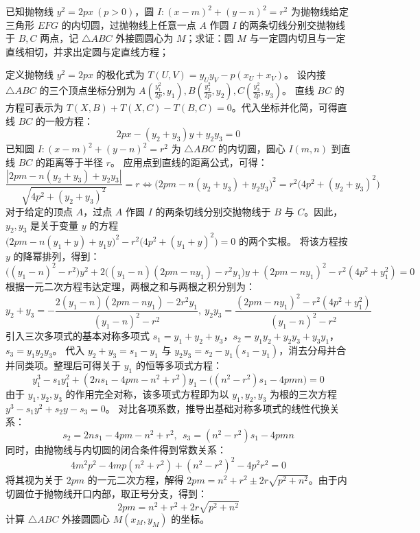 \begin{exercise}
已知抛物线 \(y^2 = 2px\ (p > 0)\)，圆 \(I: (x - m)^2 + (y - n)^2 = r^2\) 为抛物线给定三角形 \(EFG\) 的内切圆，过抛物线上任意一点 \(A\) 作圆 \(I\) 的两条切线分别交抛物线于 \(B,C\) 两点，记 \(\triangle ABC\) 外接圆圆心为 \(M\)；求证：圆 \(M\) 与一定圆内切且与一定直线相切，并求出定圆与定直线方程；
\end{exercise}
\begin{solution}
定义抛物线 $y^2 = 2px$ 的极化式为 $T(U, V) = y_U y_V - p(x_U + x_V)$。
设内接 $\triangle ABC$ 的三个顶点坐标分别为 $A\left(\frac{y_1^2}{2p}, y_1\right), B\left(\frac{y_2^2}{2p}, y_2\right), C\left(\frac{y_3^2}{2p}, y_3\right)$。
直线 $BC$ 的方程可表示为 $T(X, B) + T(X, C) - T(B, C) = 0$。代入坐标并化简，可得直线 $BC$ 的一般方程：
$$ 2px - (y_2+y_3)y + y_2 y_3 = 0 $$
已知圆 $I: (x-m)^2 + (y-n)^2 = r^2$ 为 $\triangle ABC$ 的内切圆，圆心 $I(m,n)$ 到直线 $BC$ 的距离等于半径 $r$。
应用点到直线的距离公式，可得：
$$ \frac{|2pm - n(y_2+y_3) + y_2 y_3|}{\sqrt{4p^2 + (y_2+y_3)^2}} = r\Leftrightarrow \big(2pm - n(y_2+y_3) + y_2 y_3\big)^2 = r^2\big(4p^2 + (y_2+y_3)^2\big)  $$
对于给定的顶点 $A$，过点 $A$ 作圆 $I$ 的两条切线分别交抛物线于 $B$ 与 $C$。因此，$y_2, y_3$ 是关于变量 $y$ 的方程 $\big(2pm - n(y_1+y) + y_1 y\big)^2 - r^2\big(4p^2 + (y_1+y)^2\big) = 0$ 的两个实根。
将该方程按 $y$ 的降幂排列，得到：
$$ \big((y_1 - n)^2 - r^2\big) y^2 + 2\big((y_1 - n)(2pm - n y_1) - r^2 y_1\big) y + (2pm - n y_1)^2 - r^2(4p^2 + y_1^2) = 0 $$
根据一元二次方程韦达定理，两根之和与两根之积分别为：
$$ y_2 + y_3 = -\frac{2(y_1 - n)(2pm - n y_1) - 2r^2 y_1}{(y_1 - n)^2 - r^2} ,~y_2 y_3 = \frac{(2pm - n y_1)^2 - r^2(4p^2 + y_1^2)}{(y_1 - n)^2 - r^2} $$
引入三次多项式的基本对称多项式 $s_1 = y_1+y_2+y_3$，$s_2 = y_1 y_2 + y_2 y_3 + y_3 y_1$，$s_3 = y_1 y_2 y_3$。
代入 $y_2+y_3 = s_1 - y_1$ 与 $y_2 y_3 = s_2 - y_1(s_1 - y_1)$，消去分母并合并同类项。整理后可得关于 $y_1$ 的恒等多项式方程：
$$ y_1^3 - s_1 y_1^2 + (2n s_1 - 4pm - n^2 + r^2) y_1 - \big((n^2 - r^2) s_1 - 4pmn\big) = 0 $$
由于 $y_1, y_2, y_3$ 的作用完全对称，该多项式方程即为以 $y_1, y_2, y_3$ 为根的三次方程 $y^3 - s_1 y^2 + s_2 y - s_3 = 0$。
对比各项系数，推导出基础对称多项式的线性代换关系：
$$ s_2 = 2n s_1 - 4pm - n^2 + r^2 ,~~ s_3 = (n^2 - r^2) s_1 - 4pmn $$
同时，由抛物线与内切圆的闭合条件得到常数关系：
$$ 4m^2 p^2 - 4mp(n^2+r^2) + (n^2-r^2)^2 - 4p^2 r^2 = 0 $$
将其视为关于 $2pm$ 的一元二次方程，解得 $2pm = n^2 + r^2 \pm 2r\sqrt{p^2+n^2}$。由于内切圆位于抛物线开口内部，取正号分支，得到：
$$ 2pm = n^2 + r^2 + 2r\sqrt{p^2+n^2} $$
计算 $\triangle ABC$ 外接圆圆心 $M(x_M, y_M)$ 的坐标。

\end{solution}
